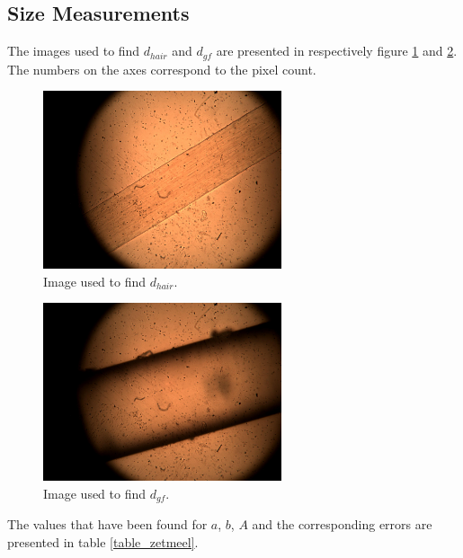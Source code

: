 \subsection{Size Measurements}
\label{appendix_size}

The images used to find $d_{hair}$ and $d_{gf}$ are presented in respectively figure \ref{fig_hair} and \ref{fig_gf}. The numbers on the axes correspond to the pixel count.

\begin{figure}[h!]
    \centering
    \includegraphics[width=7cm]{afbeeldingen/size/hair.jpg}
    \captionsetup{font=small, justification = centering}
    \caption{Image used to find $d_{hair}$.}
    \label{fig_hair}
\end{figure}

\begin{figure}[h!]
    \centering
    \includegraphics[width=7cm]{afbeeldingen/size/gf.jpg}
    \captionsetup{font=small, justification = centering}
    \caption{Image used to find $d_{gf}$.}
    \label{fig_gf}
\end{figure}

\newpage

The values that have been found for $a$, $b$, $A$ and the corresponding errors are presented in table \ref{table_zetmeel}.

